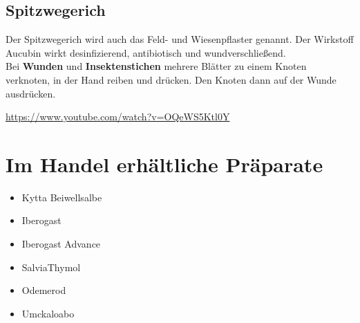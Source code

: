 \subsection{Spitzwegerich}


Der Spitzwegerich wird auch das Feld- und Wiesenpflaster genannt. Der Wirkstoff Aucubin wirkt desinfizierend, antibiotisch und wundverschließend.\\
Bei \textbf{Wunden} und \textbf{Insektenstichen} mehrere Blätter zu einem Knoten verknoten, in der Hand reiben und drücken. Den Knoten dann auf der Wunde ausdrücken. 

 

\cite{swrhandwerkskunst}  

\url{https://www.youtube.com/watch?v=OQeWS5Ktl0Y}



\section{Im Handel erhältliche Präparate}


\begin{itemize}
	\item Kytta Beiwellsalbe
	\item Iberogast
	\item Iberogast Advance
	\item SalviaThymol
	\item Odemerod
	\item Umckaloabo
\end{itemize}

